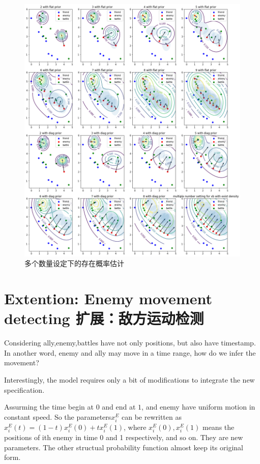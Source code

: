 \documentclass{article}
\begin{document}
\begin{figure}[ht]
\includegraphics[width=0.99\linewidth]{big_vb_exist_prob.png}
\caption{多个数量设定下的存在概率估计}
\label{fig:bigVbExist}
\end{figure}



\section{Extention: Enemy movement detecting 扩展：敌方运动检测}

Considering ally,enemy,battles have not only positions, but also have timestamp. In another word,
enemy and ally may move in a time range, how do we infer the movement?

Interestingly, the model requires only a bit of modifications to integrate the new specification.

Assurming the time begin at $0$ and end at $1$, and enemy have uniform motion in constant speed.
So the parameters$x^E_i$ can be rewritten as $x^E_i(t) = (1-t)x^E_i(0) + tx^E_i(1)$, 
where $x^E_i(0),x^E_i(1)$ means the positions of ith enemy in time 0 and 1 respectively, and so on.
They are new parameters. The other structual probability function almost keep its original form.
\end{document}
